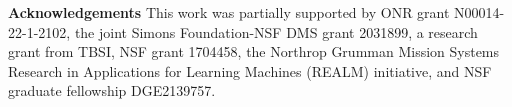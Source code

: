 \documentclass[10pt,twocolumn,letterpaper]{article}
\begin{document}
   \medskip \noindent
\textbf{Acknowledgements}
This work was partially supported by ONR grant N00014-22-1-2102, the joint Simons Foundation-NSF DMS grant 2031899, a research grant from TBSI, NSF grant 1704458, the Northrop Grumman Mission Systems Research in Applications for Learning Machines (REALM) initiative, and NSF graduate fellowship DGE2139757.
   




 
 
 
 
 
 

 
 



   
   {\small
   
   
   }
   
   \clearpage
   \appendix
   \onecolumn
   
\end{document}
